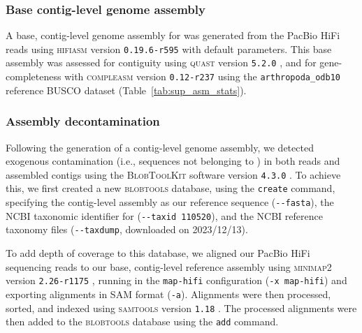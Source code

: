 \subsubsection*{Base contig-level genome assembly}

A base, contig-level genome assembly for \bgla{} was generated from
the PacBio HiFi reads using \textsc{hifiasm} version \texttt{0.19.6-r595}
\citep{cheng_haplotype-resolved_2021,cheng_haplotype-resolved_2022} with default
parameters. This base assembly was assessed for contiguity using \textsc{quast}
version \texttt{5.2.0} \citep{gurevich_quast_2013}, and for gene-completeness with
\textsc{compleasm} version \texttt{0.12-r237} \citep{huang_compleasm_2023} using
the \texttt{arthropoda\_odb10} reference \textsc{BUSCO} dataset \citep{simao_busco_2015,
manni_busco_2021,tegenfeldt_orthodb_2025} (Table~\ref{tab:sup_asm_stats}).

\subsubsection*{Assembly decontamination}

Following the generation of a contig-level genome assembly, we detected
exogenous contamination (i.e., sequences not belonging to \bgla)
in both reads and assembled contigs using the \textsc{BlobToolKit} software version
\texttt{4.3.0} \citep{challis_blobtoolkit_2020}. To achieve this, we first created
a new \textsc{blobtools} database, using the \texttt{create} command, specifying the
contig-level assembly as our reference sequence (\texttt{-{}-fasta}), the NCBI
taxonomic identifier for \bgla{} (\texttt{-{}-taxid 110520}), and the NCBI reference
taxonomy files (\texttt{-{}-taxdump}, downloaded on 2023/12/13).
\vspace{0.1cm}

To add depth of coverage to this database, we aligned our PacBio HiFi sequencing
reads to our base, contig-level reference assembly using \textsc{minimap2} version
\texttt{2.26-r1175} \citep{li_minimap2_2018}, running in the \texttt{map-hifi}
configuration (\texttt{-x map-hifi}) and exporting alignments in SAM format
(\texttt{-a}). Alignments were then processed, sorted, and indexed using
\textsc{samtools} version \texttt{1.18} \citep{li_sequence_2009}. The processed
alignments were then added to the \textsc{blobtools} database using the \texttt{add}
command.
\vspace{0.1cm}

